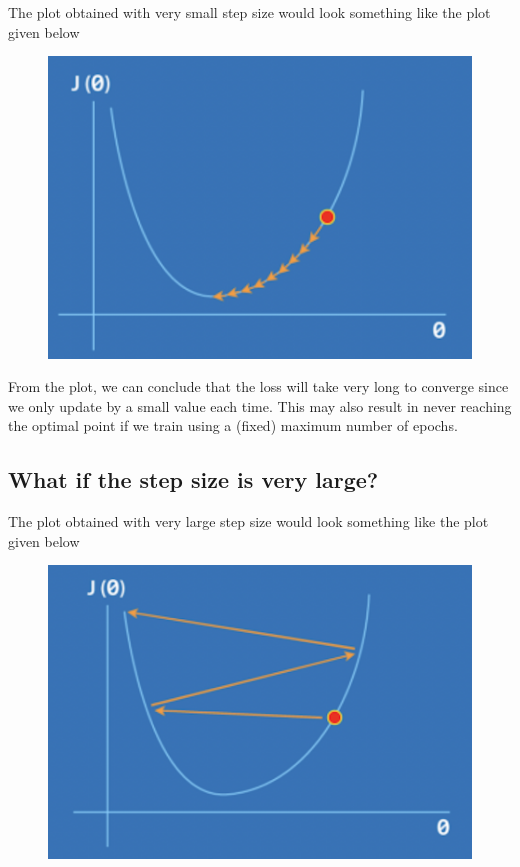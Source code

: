 \documentclass{report}
\begin{document}
The plot obtained with very small step size would look something like the plot given below
\begin{figure}[H]
  \includegraphics[scale=0.3]{images/11.png}
  \centering
\end{figure}

From the plot, we can conclude that the loss will take very long to converge since we only update by a small value each time. This may also result in never reaching the optimal point if we train using a (fixed) maximum number of epochs.

\subsection{What if the step size is very large?}

The plot obtained with very large step size would look something like the plot given below
\begin{figure}[H]
  \includegraphics[scale=0.3]{images/12.png}
  \centering
\end{figure}
\end{document}
